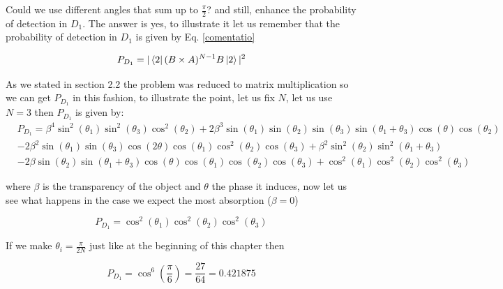 \documentclass[12pt]{book}
\begin{document}
Could we use different angles that sum up to $\frac{\pi}{2}$? and still, enhance the probability of detection in $D_{1}$. The answer is yes, to illustrate it let us remember that the probability of detection in $D_{1}$ is given by Eq. \ref{comentatio}

\begin{equation*}
P_{D_{1}}=|\bra{2} (B \times A)^{N-1}B \ket{2}|^2
\end{equation*}

As we stated in section 2.2 the problem was reduced to matrix multiplication so we can get $P_{D_{1}}$ in this fashion, to illustrate the point, let us fix $N$, let us use $N=3$ then $P_{D_{1}}$ is given by:
\small
\begin{align*}
&P_{D_{1}}=\beta^{4} \sin^{2}{\left(\theta_{1} \right)} \sin^{2}{\left(\theta_{3} \right)} \cos^{2}{\left(\theta_{2} \right)} + 2 \beta^{3} \sin{\left(\theta_{1} \right)} \sin{\left(\theta_{2} \right)} \sin{\left(\theta_{3} \right)} \sin{\left(\theta_{1} + \theta_{3} \right)} \cos{\left(\theta \right)} \cos{\left(\theta_{2} \right)} \\
 & - 2 \beta^{2} \sin{\left(\theta_{1} \right)} \sin{\left(\theta_{3} \right)} \cos{\left(2 \theta \right)} \cos{\left(\theta_{1} \right)} \cos^{2}{\left(\theta_{2} \right)} \cos{\left(\theta_{3} \right)} + \beta^{2} \sin^{2}{\left(\theta_{2} \right)} \sin^{2}{\left(\theta_{1} + \theta_{3} \right)} \\
 & - 2 \beta \sin{\left(\theta_{2} \right)} \sin{\left(\theta_{1} + \theta_{3} \right)} \cos{\left(\theta \right)} \cos{\left(\theta_{1} \right)} \cos{\left(\theta_{2} \right)} \cos{\left(\theta_{3} \right)} + \cos^{2}{\left(\theta_{1} \right)} \cos^{2}{\left(\theta_{2} \right)} \cos^{2}{\left(\theta_{3} \right)}
\end{align*}
\normalsize

where $\beta$ is the transparency of the object and $\theta$ the phase it induces, now let us see what happens in the case we expect the most absorption ($\beta=0$) 

\begin{equation}
P_{D_{1}}=\cos^{2}{\left(\theta_{1} \right)} \cos^{2}{\left(\theta_{2} \right)} \cos^{2}{\left(\theta_{3} \right)}
\end{equation}

If we make $\theta_{i}=\frac{\pi}{2N}$ just like at the beginning of this chapter then

\begin{equation}
P_{D_{1}}=\cos^{6}{\left(\frac{\pi}{6} \right)}=\frac{27}{64}=0.421875
\end{equation} 
\end{document}
